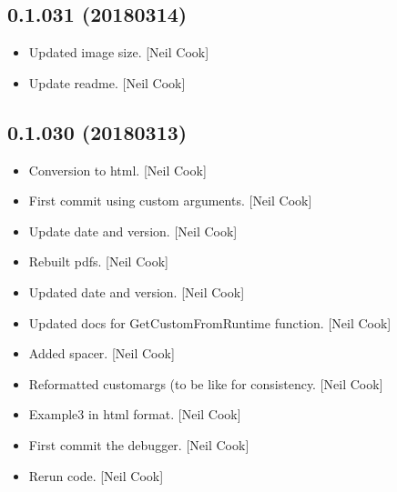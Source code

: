 \documentclass[a4paper,10pt,english]{report}
\begin{document}
\subsection{0.1.031 (2018\sphinxhyphen{}03\sphinxhyphen{}14)}
\label{\detokenize{misc/changelog:id491}}\begin{itemize}
\item {} 
Updated image size. {[}Neil Cook{]}

\item {} 
Update readme. {[}Neil Cook{]}

\end{itemize}


\subsection{0.1.030 (2018\sphinxhyphen{}03\sphinxhyphen{}13)}
\label{\detokenize{misc/changelog:id492}}\begin{itemize}
\item {} 
Conversion to html. {[}Neil Cook{]}

\item {} 
First commit \sphinxhyphen{} using custom arguments. {[}Neil Cook{]}

\item {} 
Update date and version. {[}Neil Cook{]}

\item {} 
Rebuilt pdfs. {[}Neil Cook{]}

\item {} 
Updated date and version. {[}Neil Cook{]}

\item {} 
Updated docs for GetCustomFromRuntime function. {[}Neil Cook{]}

\item {} 
Added spacer. {[}Neil Cook{]}

\item {} 
Reformatted customargs (to be like  for consistency. {[}Neil
Cook{]}

\item {} 
Example3 in html format. {[}Neil Cook{]}

\item {} 
First commit \sphinxhyphen{} the debugger. {[}Neil Cook{]}

\item {} 
Rerun code. {[}Neil Cook{]}

\end{itemize}
\end{document}
